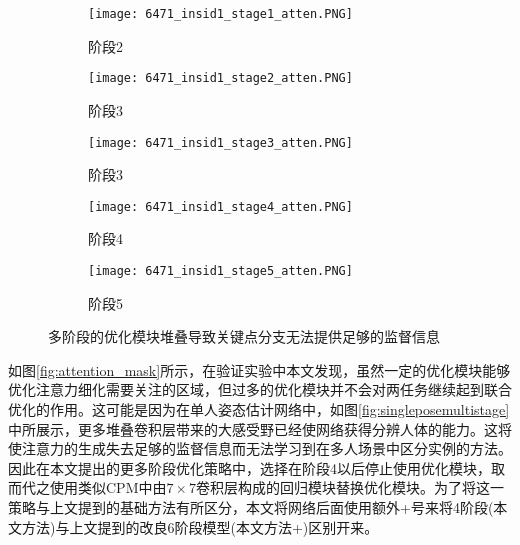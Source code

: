 \begin{figure}[ht]
	\centering
	\begin{subfigure}[b]{0.18\linewidth}
		\texttt{[image: 6471\_insid1\_stage1\_atten.PNG]}
		\caption{阶段2}
	\end{subfigure}
	\begin{subfigure}[b]{0.18\linewidth}
		\texttt{[image: 6471\_insid1\_stage2\_atten.PNG]}
		\caption{阶段3}
	\end{subfigure}
	\begin{subfigure}[b]{0.18\linewidth}
		\texttt{[image: 6471\_insid1\_stage3\_atten.PNG]}
		\caption{阶段3}
	\end{subfigure}
	\begin{subfigure}[b]{0.18\linewidth}
		\texttt{[image: 6471\_insid1\_stage4\_atten.PNG]}
		\caption{阶段4}
	\end{subfigure}
	\begin{subfigure}[b]{0.18\linewidth}
		\texttt{[image: 6471\_insid1\_stage5\_atten.PNG]}
		\caption{阶段5}
	\end{subfigure}
	\caption{多阶段的优化模块堆叠导致关键点分支无法提供足够的监督信息}
	\label{fig:multistageattention}
\end{figure}

如图\ref{fig:attention_mask}所示，在验证实验中本文发现，虽然一定的优化模块能够优化注意力细化需要关注的区域，但过多的优化模块并不会对两任务继续起到联合优化的作用。这可能是因为在单人姿态估计网络中，如图\ref{fig:singleposemultistage}中所展示，更多堆叠卷积层带来的大感受野已经使网络获得分辨人体的能力。这将使注意力的生成失去足够的监督信息而无法学习到在多人场景中区分实例的方法。因此在本文提出的更多阶段优化策略中，选择在阶段4以后停止使用优化模块，取而代之使用类似CPM\cite{wei2016convolutional}中由$7\times7$卷积层构成的回归模块替换优化模块。为了将这一策略与上文提到的基础方法有所区分，本文将网络后面使用额外+号来将4阶段(本文方法)与上文提到的改良6阶段模型(本文方法+)区别开来。

